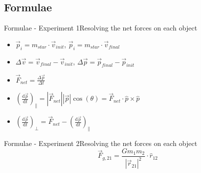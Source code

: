 \subsection{Formulae}
\begin{frame}{Formulae - Experiment 1}{Resolving the net forces on each object}
    \begin{itemize}
    \item \(\displaystyle\vec{p}_i = m_{star} \cdot \vec{v}_{init}\), \(\vec{p}_i = m_{star} \cdot \vec{v}_{final}\)
    \item \(\displaystyle\Delta \vec{v} = \vec{v}_{final} - \vec{v}_{init}\), \(\Delta \vec{p} = \vec{p}_{final} - \vec{p}_{init}\)
    \item \(\displaystyle\vec{F}_{net} = \frac{\Delta \vec{p}}{\Delta t}\)
    \item \(\displaystyle\left(\frac{\mathrm{d}\vec{p}}{\mathrm{d}t}\right)_{\parallel} = |\vec{F}_{net}| |\vec{p}| \cos(\theta)= \vec{F}_{net}\cdot \hat{p} \times \hat{p}\)
    \item \(\displaystyle\left(\frac{\mathrm{d}\vec{p}}{\mathrm{d}t}\right)_{\perp} = 
    \vec{F}_{net} - \left(\frac{\mathrm{d}\vec{p}}{\mathrm{d}t}\right)_{\parallel}\)
    \end{itemize}
\end{frame}

\begin{frame}{Formulae - Experiment 2}{Resolving the net forces on each object}
    \begin{equation}
    \vec{F}_{g,21} = \frac{Gm_1m_2}{|\vec{r}_{21}|^2}\cdot \hat{r}_{12}
    \end{equation}
\end{frame}